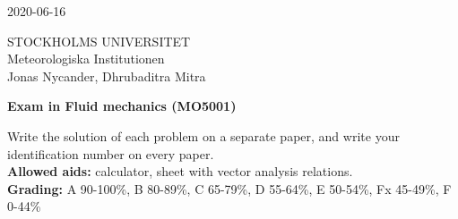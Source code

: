 \documentclass[12pt,a4paper]{article}
\begin{document}
\begin{center}
2020-06-16
\end{center}
STOCKHOLMS UNIVERSITET\\
Meteorologiska Institutionen\\
Jonas Nycander, Dhrubaditra Mitra\\
\vspace{1cm}

\begin{center}
{\bf\large Exam in Fluid mechanics (MO5001)}\\
\end{center}

Write the solution of each problem on a separate paper, and write your identification number on every paper.\\

{\bf Allowed aids:} calculator, sheet with vector analysis relations.\\

{\bf Grading:} A 90-100\%, B 80-89\%, C 65-79\%, D 55-64\%, E 50-54\%, Fx 45-49\%, F 0-44\% \\
\vspace{0.5cm}
\end{document}

